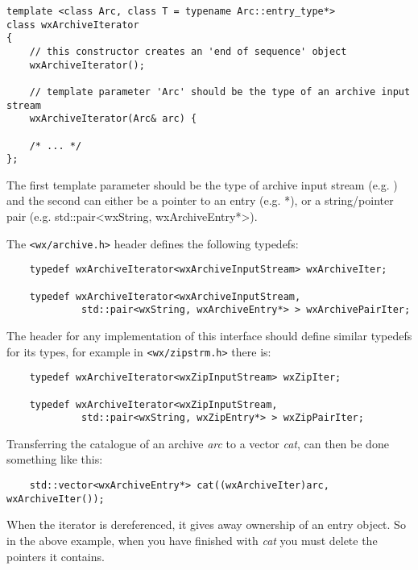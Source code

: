 \begin{verbatim}
template <class Arc, class T = typename Arc::entry_type*>
class wxArchiveIterator
{
    // this constructor creates an 'end of sequence' object
    wxArchiveIterator();

    // template parameter 'Arc' should be the type of an archive input stream
    wxArchiveIterator(Arc& arc) {

    /* ... */
};

\end{verbatim}

The first template parameter should be the type of archive input stream
(e.g. ) and the
second can either be a pointer to an entry
(e.g. *), or a string/pointer pair
(e.g. std::pair<wxString, wxArchiveEntry*>).

The {\tt <wx/archive.h>} header defines the following typedefs:

\begin{verbatim}
    typedef wxArchiveIterator<wxArchiveInputStream> wxArchiveIter;

    typedef wxArchiveIterator<wxArchiveInputStream,
             std::pair<wxString, wxArchiveEntry*> > wxArchivePairIter;

\end{verbatim}

The header for any implementation of this interface should define similar
typedefs for its types, for example in {\tt <wx/zipstrm.h>} there is:

\begin{verbatim}
    typedef wxArchiveIterator<wxZipInputStream> wxZipIter;

    typedef wxArchiveIterator<wxZipInputStream,
             std::pair<wxString, wxZipEntry*> > wxZipPairIter;

\end{verbatim}

Transferring the catalogue of an archive {\it arc} to a vector {\it cat},
can then be done something like this:

\begin{verbatim}
    std::vector<wxArchiveEntry*> cat((wxArchiveIter)arc, wxArchiveIter());

\end{verbatim}

When the iterator is dereferenced, it gives away ownership of an entry
object. So in the above example, when you have finished with {\it cat}
you must delete the pointers it contains.

